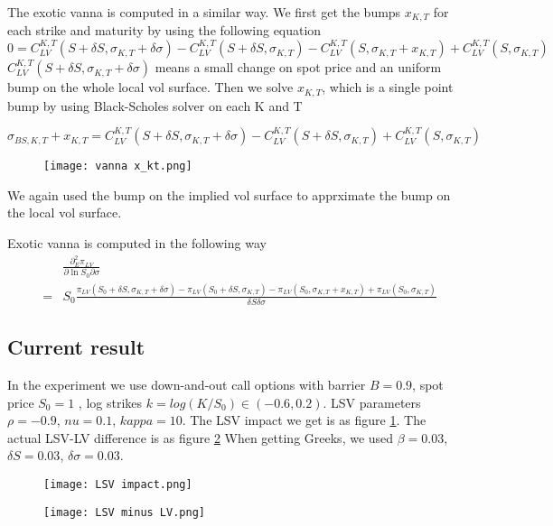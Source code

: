 \documentclass[12pt]{article}
\numberwithin{equation}{section}
\begin{document}
The exotic vanna is computed in a similar way. We first get the bumps $x_{K,T}$ for each strike and maturity by using the following equation
\begin{equation} \label{eq:9}
    0=C_{LV}^{K,T}(S+\delta S,\sigma_{K,T}+\delta \sigma)-C_{LV}^{K,T}(S+\delta S,\sigma_{K,T})-C_{LV}^{K,T}(S,\sigma_{K,T}+x_{K,T})+C_{LV}^{K,T}(S,\sigma_{K,T})
\end{equation} 
$C_{LV}^{K,T}(S+\delta S,\sigma_{K,T}+\delta \sigma)$ means a small change on spot price and an
uniform bump on the whole local vol surface.
Then we solve $x_{K,T}$, which is a single point bump by using Black-Scholes solver on each K and T

\[
    \sigma_{BS,K,T}+x_{K,T}=C_{LV}^{K,T}(S+\delta S,\sigma_{K,T}+\delta \sigma)-C_{LV}^{K,T}(S+\delta S,\sigma_{K,T})+C_{LV}^{K,T}(S,\sigma_{K,T})
\]
\begin{figure}[h]
    \texttt{[image: vanna x\_kt.png]}
\end{figure}
We again used the bump on the implied vol surface to apprximate the bump on the local vol surface.

Exotic vanna is computed in the following way
\begin{eqnarray*} 
    &&\frac{\partial_E^2 \pi_{LV}}{\partial \ln S_0 \partial \sigma}\\
    &=&S_0\frac{\pi_{LV}(S_0+\delta S ,\sigma_{K,T}+\delta \sigma)-\pi_{LV}(S_0+\delta S ,\sigma_{K,T})-\pi_{LV}(S_0,\sigma_{K,T}+x_{K,T})+\pi_{LV}(S_0,\sigma_{K,T})}
    {\delta S \delta \sigma}
\end{eqnarray*} 


\subsection{Current result}
In the experiment we use down-and-out call options with barrier $B=0.9$, spot price $S_0=1$ , log strikes $k=log(K/S_0) \in (-0.6,0.2)$. LSV parameters $\rho=-0.9$, $nu=0.1$, $kappa=10$. The LSV impact we get is as figure \ref{fig:LSV impact}. The actual LSV-LV difference is as figure \ref{fig:LSV-LV}
When getting Greeks, we used $\beta=0.03$, $\delta S=0.03$, $\delta \sigma=0.03$.
\begin{figure}[h]
    \texttt{[image: LSV impact.png]}
    \label{fig:LSV impact}
\end{figure}

\begin{figure}[h]
    \texttt{[image: LSV minus LV.png]}
    \label{fig:LSV-LV}
\end{figure}
\end{document}
